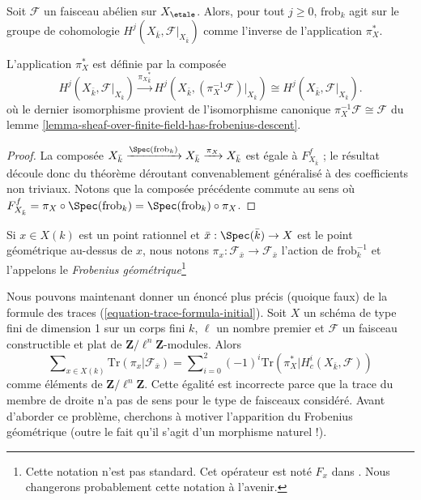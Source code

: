 \begin{theorem}
\label{theorem-geometric-arithmetic-inverse}
Soit $\mathcal{F}$ un faisceau abélien sur $X_\etale$. Alors, pour tout
$j\geq 0$, $\text{frob}_k$ agit sur le groupe de cohomologie $H^j(X_{\bar k},
\mathcal{F}|_{X_{\bar k}})$ comme l'inverse de l'application $\pi_X^*$.
\end{theorem}

\noindent
L'application $\pi_X^*$ est définie par la composée
$$
H^j(X_{\bar k}, \mathcal{F}|_{X_{\bar k}}) \xrightarrow{{\pi_X}_{\bar k}^*}
H^j(X_{\bar k}, (\pi_X^{-1} \mathcal{F})|_{X_{\bar k}}) \cong
H^j(X_{\bar k}, \mathcal{F}|_{X_{\bar k}}).
$$
où le dernier isomorphisme provient de l'isomorphisme canonique
$\pi_X^{-1} \mathcal{F} \cong \mathcal{F}$ du
lemme \ref{lemma-sheaf-over-finite-field-has-frobenius-descent}.

\begin{proof}
La composée $X_{\bar k} \xrightarrow{\Spec(\text{frob}_k)} X_{\bar k}
\xrightarrow{\pi_X} X_{\bar k}$ est égale à $F_{X_{\bar k}}^f$ ; le
résultat découle donc du théorème déroutant convenablement généralisé à des
coefficients non triviaux. Notons que la composée précédente commute au sens où
$F_{X_{\bar k}}^f = \pi_X \circ \Spec(\text{frob}_k) =
\Spec(\text{frob}_k) \circ \pi_X$.
\end{proof}

\begin{definition}
\label{definition-geometric-frobenius-on-stalk}
Si $x \in X(k)$ est un point rationnel et $\bar x : \Spec(\bar k) \to X$
est le point géométrique au-dessus de $x$, nous notons $\pi_x : \mathcal{F}_{\bar x} \to
\mathcal{F}_{\bar x}$ l'action de $\text{frob}_k^{-1}$ et l'appelons le
{\it Frobenius géométrique}\footnote{Cette notation n'est pas standard.
Cet opérateur est noté $F_x$ dans \cite{SGA4.5}. Nous changerons probablement
cette notation à l'avenir.}
\end{definition}

\noindent
Nous pouvons maintenant donner un énoncé plus précis (quoique faux) de la formule des
traces (\ref{equation-trace-formula-initial}). Soit $X$ un schéma de
type fini de dimension 1
sur un corps fini $k$, $\ell$ un nombre premier et $\mathcal{F}$ un faisceau
constructible et plat de $\mathbf{Z}/\ell^n\mathbf{Z}$-modules. Alors
\begin{equation}
\label{equation-trace-formula-second}
\sum\nolimits_{x \in X(k)}
\text{Tr}(\pi_x | \mathcal{F}_{\bar x})
=
\sum\nolimits_{i = 0}^2
(-1)^i \text{Tr}(\pi_X^* | H^i_c(X_{\bar k}, \mathcal{F}))
\end{equation}
comme éléments de $\mathbf{Z}/\ell^n\mathbf{Z}$. Cette égalité est incorrecte
parce que la trace du membre de droite n'a pas de sens pour le type de
faisceaux considéré. Avant d'aborder ce problème, cherchons à motiver
l'apparition du Frobenius géométrique (outre le fait qu'il s'agit d'un
morphisme naturel !).

